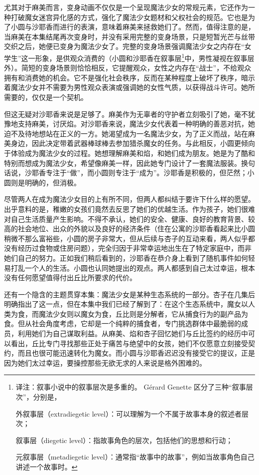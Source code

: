 尤其对于麻美而言，变身动画不仅仅是一个呈现魔法少女的常规元素，它还作为一种打破魔女迷宫异化感的方式，强化了魔法少女题材和父权社会的规范。它也是为了小圆与沙耶香而进行的表演，意味着麻美来拯救她们了。然而，值得注意的是，当麻美在本集结尾再次变身时，并没有采用完整的变身场景，只是短暂光芒与丝带交织之后，她便已变身为魔法少女了。完整的变身场景强调魔法少女之内存在“女学生”这一形象，是供观众消费的（小圆和沙耶香在叙事层\footnote{译注：叙事小说中的叙事层次是多重的。 Gérard Genette 区分了三种“叙事层次”，分别是，\par 外叙事层（extradiegetic level）：可以理解为一个不属于故事本身的叙述者层次；\par 叙事层（diegetic level）：指故事角色的层次，包括他们的思想和行动；\par 元叙事层（metadiegetic level）：通常指“故事中的故事”，例如当故事角色自己讲述一个故事时。}中，男性凝视在叙事层外）。简短的变身场景则恰恰相反，它提醒观众，女性之内存在“战士”，不给观众拥有和消费她的机会。它不是强化社会秩序，反而在某种程度上破坏了秩序，暗示着魔法少女并不需要为男性观众表演或强调她的女性气质，以获得战斗许可。她所需要的，仅仅是一个契机。

但这无疑对沙耶香来说是足够了。麻美作为无辜者的守护者立刻吸引了她，毫不犹豫地支持麻美，讨厌焰。对沙耶香来说，魔法少女代表着一种明确的善恶对抗，她迫不及待地想站在正义的一方。她渴望成为一名魔法少女，为了正义而战，站在麻美身边，因此决定带着武器棒球棒去参加猎杀魔女的任务。与此相反，小圆更倾向于体验成为魔法少女的过程。她想理解麻美和焰，和她们成为朋友。她是为了酷和特别而想成为魔法少女，希望像麻美一样，因此她专门设计了一套魔法服装。换句话说，沙耶香专注于“做”，而小圆则专注于“成为”。沙耶香是积极的，但茫然；小圆则是明确的，但消极。

尽管两人在成为魔法少女目的上有所不同，但两人都纠结于要许下什么样的愿望。出乎意料的是，稚嫩的女孩们竟然去反思了她们的优越生活。作为孩子，她们很难对自己生活质量产生影响。不得不承认，她们的安全、健康、良好的教育背景、较高的社会地位、出众的外貌以及良好的经济条件（住在公寓的沙耶香看起来比小圆稍微不那么富裕些，小圆的房子非常大，但从后续与杏子的互动来看，两人似乎都没有经历过食物或住房问题），完全归因于非常幸运地出生在了特定家庭中，而非她们自己的努力。正如我们稍后看到的，沙耶香在恭介身上看到了随机事件如何轻易打乱一个人的生活。小圆也认同她提出的观点。两人都感到自己太过幸运，根本没有任何愿望值得付出丘比所要求的代价。

还有一个隐含的主题贯穿本集：魔法少女是某种生态系统的一部分。杏子在几集后明确指出了这一点，但在本集中我们已经了解到了：在这个生态系统中，魔女以人类为食，而魔法少女则以魔女为食，丘比则是分解者，它从捕食行为的副产品为食。但从社会角度考虑，它却是一个纯粹的捕食者，专门挑选群体中最脆弱的成员，利用她们为自己谋取利益。从麻美、焰和杏子回忆她们与丘比签约的经历中可以看出，丘比专门寻找那些正处于痛苦与绝望中的女孩，她们不仅愿意立刻接受契约，而且也很可能迅速转化为魔女。而小圆与沙耶香迟迟没有接受它的提议，正是因为她们太过幸运，要操控那些无欲无求的人来说是格外困难的。

